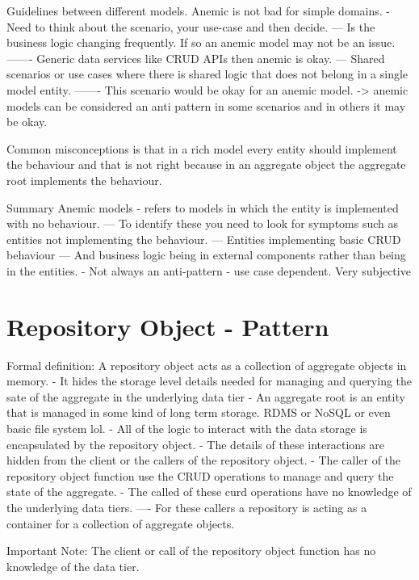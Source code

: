 \documentclass[a4paper, 11pt]{book}
\begin{document}
    Guidelines between different models.
    Anemic is not bad for simple domains.
    - Need to think about the scenario, your use-case and then decide.
    --- Is the business logic changing frequently. If so an anemic model may not be an issue.
    ------- Generic data services like CRUD APIs then anemic is okay.
    --- Shared scenarios or use cases where there is shared logic that does not belong in a single model entity.
    ------- This scenario would be okay for an anemic model.
    -> anemic models can be considered an anti pattern in some scenarios and in others it may be okay.

    Common misconceptions is that in a rich model every entity should implement the behaviour and that is not right because in an aggregate object the aggregate root implements the behaviour.

    Summary
    Anemic models - refers to models in which the entity is implemented with no behaviour.
    --- To identify these you need to look for symptoms such as entities not implementing the behaviour.
    --- Entities implementing basic CRUD behaviour
    --- And business logic being in external components rather than being in the entities.
    - Not always an anti-pattern - use case dependent. Very subjective


    \section{Repository Object - Pattern}

    Formal definition: A repository object acts as a collection of aggregate objects in memory.
    - It hides the storage level details needed for managing and querying the sate of the aggregate in the underlying data tier
    - An aggregate root is an entity that is managed in some kind of long term storage. RDMS or NoSQL or even basic file system lol.
    - All of the logic to interact with the data storage is encapsulated by the repository object.
    - The details of these interactions are hidden from the client or the callers of the repository object.
    - The caller of the repository object function use the CRUD operations to manage and query the state of the aggregate.
    - The called of these curd operations have no knowledge of the underlying data tiers.
    ---- For these callers a repository is acting as a container for a collection of aggregate objects.

    Important Note: The client or call of the repository object function has no knowledge of the data tier.
\end{document}

